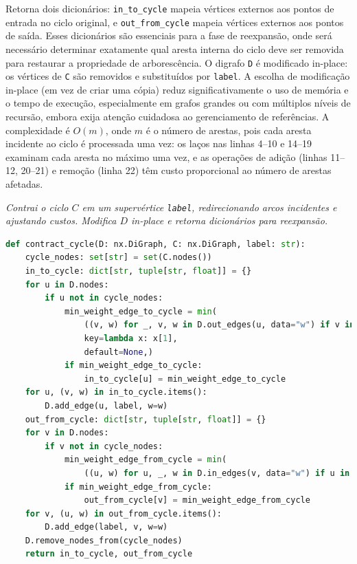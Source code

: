 Retorna dois dicionários: \texttt{in\_to\_cycle} mapeia vértices externos aos pontos de entrada no ciclo original, e \texttt{out\_from\_cycle} mapeia vértices externos aos pontos de saída. Esses dicionários são essenciais para a fase de reexpansão, onde será necessário determinar exatamente qual aresta interna do ciclo deve ser removida para restaurar a propriedade de arborescência. O digrafo \texttt{D} é modificado in-place: os vértices de \texttt{C} são removidos e substituídos por \texttt{label}. A escolha de modificação in-place (em vez de criar uma cópia) reduz significativamente o uso de memória e o tempo de execução, especialmente em grafos grandes ou com múltiplos níveis de recursão, embora exija atenção cuidadosa ao gerenciamento de referências. A complexidade é \(O(m)\), onde \(m\) é o número de arestas, pois cada aresta incidente ao ciclo é processada uma vez: os laços nas linhas 4--10 e 14--19 examinam cada aresta no máximo uma vez, e as operações de adição (linhas 11--12, 20--21) e remoção (linha 22) têm custo proporcional ao número de arestas afetadas.

\begin{tcolorbox}[
        enhanced, breakable,
        colframe=blue!60!black, colback=blue!2,
        colbacktitle=blue!15, coltitle=black,
        title={Contração de ciclo},
        boxed title style={sharp corners, boxrule=0.6pt},
        sharp corners, boxrule=0.6pt
    ]
    \emph{Contrai o ciclo $C$ em um supervértice \texttt{label}, redirecionando arcos incidentes e ajustando custos. Modifica $D$ in-place e retorna dicionários para reexpansão.}
    \tcblower
    \begin{lstlisting}[mathescape=true, language=Python]
def contract_cycle(D: nx.DiGraph, C: nx.DiGraph, label: str):
    cycle_nodes: set[str] = set(C.nodes())
    in_to_cycle: dict[str, tuple[str, float]] = {}
    for u in D.nodes:
        if u not in cycle_nodes:
            min_weight_edge_to_cycle = min(
                ((v, w) for _, v, w in D.out_edges(u, data="w") if v in cycle_nodes),
                key=lambda x: x[1],
                default=None,)
            if min_weight_edge_to_cycle:
                in_to_cycle[u] = min_weight_edge_to_cycle
    for u, (v, w) in in_to_cycle.items():
        D.add_edge(u, label, w=w)
    out_from_cycle: dict[str, tuple[str, float]] = {}
    for v in D.nodes:
        if v not in cycle_nodes:
            min_weight_edge_from_cycle = min(
                ((u, w) for u, _, w in D.in_edges(v, data="w") if u in cycle_nodes),key=lambda x: x[1], default=None,)
            if min_weight_edge_from_cycle:
                out_from_cycle[v] = min_weight_edge_from_cycle
    for v, (u, w) in out_from_cycle.items():
        D.add_edge(label, v, w=w)
    D.remove_nodes_from(cycle_nodes)
    return in_to_cycle, out_from_cycle  
\end{lstlisting}
\end{tcolorbox}

